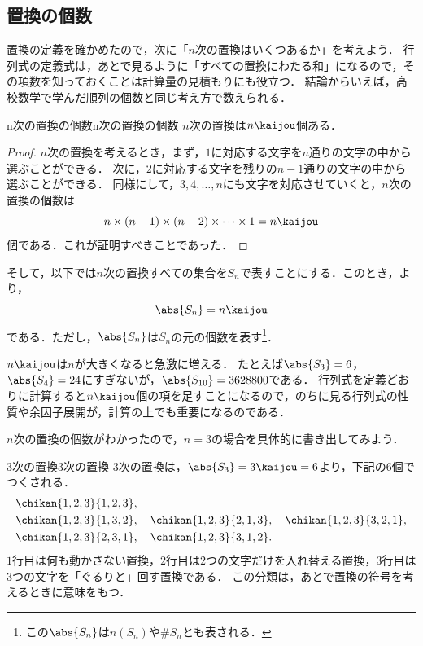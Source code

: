 \subsection{置換の個数}

置換の定義を確かめたので，次に「$n$次の置換はいくつあるか」を考えよう．
行列式の定義式は，あとで見るように「すべての置換にわたる和」になるので，その項数を知っておくことは計算量の見積もりにも役立つ．
結論からいえば，高校数学で学んだ順列の個数と同じ考え方で数えられる．

\begin{prop}{n次の置換の個数}{n次の置換の個数}
  $n$次の置換は$n\kaijou$個ある．
\end{prop}

\begin{tleftbar}
\begin{proof}
  $n$次の置換を考えるとき，まず，$1$に対応する文字を$n$通りの文字の中から選ぶことができる．
  次に，$2$に対応する文字を残りの$n-1$通りの文字の中から選ぶことができる．
  同様にして，$3,4,\ldots,n$にも文字を対応させていくと，$n$次の置換の個数は
  \[
  n \times (n-1) \times (n-2) \times \cdots \times 1 = n\kaijou
  \]
  個である．これが証明すべきことであった．
\end{proof}
\end{tleftbar}

そして，以下では$n$次の置換すべての集合を$S_n$で表すことにする．このとき，より，
\[
\abs{S_n} = n\kaijou
\]
である．ただし，$\abs{S_n}$は$S_n$の元の個数を表す\footnote{この$\abs{S_n}$は$n(S_n)$や$\# S_n$とも表される．}．

$n\kaijou$は$n$が大きくなると急激に増える．
たとえば$\abs{S_3} = 6$，$\abs{S_4} = 24$にすぎないが，$\abs{S_{10}} = 3628800$である．
行列式を定義どおりに計算すると$n\kaijou$個の項を足すことになるので，のちに見る行列式の性質や余因子展開が，計算の上でも重要になるのである．

$n$次の置換の個数がわかったので，$n = 3$の場合を具体的に書き出してみよう．

\begin{example}{3次の置換}{3次の置換}
  3次の置換は，$\abs{S_3} = 3\kaijou = 6$より，下記の$6$個でつくされる．
  \begin{align*}
    &\chikan{1, 2, 3}{1, 2, 3}, \\
    &\chikan{1, 2, 3}{1, 3, 2}, \quad
    \chikan{1, 2, 3}{2, 1, 3},\quad 
    \chikan{1, 2, 3}{3, 2, 1}, \\
    &\chikan{1, 2, 3}{2, 3, 1},\quad 
    \chikan{1, 2, 3}{3, 1, 2}.
  \end{align*}
  $1$行目は何も動かさない置換，$2$行目は$2$つの文字だけを入れ替える置換，$3$行目は$3$つの文字を「ぐるりと」回す置換である．
  この分類は，あとで置換の符号を考えるときに意味をもつ．
\end{example}

